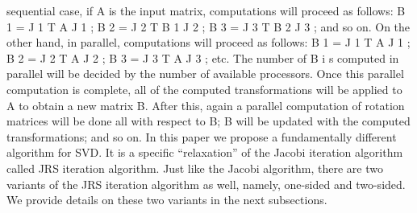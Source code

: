 \documentclass[10pt, conference, compsocconf]{IEEEtran}
\begin{document}
sequential case, if A is the input matrix, computations will
proceed as follows: B 1 = J 1 T A J 1 ; B 2 = J 2 T B 1 J 2 ; B 3 =
J 3 T B 2 J 3 ; and so on. On the other hand, in parallel, computations
will proceed as follows: B 1 = J 1 T A J 1 ; B 2 = J 2 T A J 2 ; B 3 =
J 3 T A J 3 ; etc. The number of B i s computed in parallel will
be decided by the number of available processors. Once
this parallel computation is complete, all of the computed
transformations will be applied to A to obtain a new matrix
B. After this, again a parallel computation of rotation matrices
will be done all with respect to B; B will be updated with the
computed transformations; and so on.
In this paper we propose a fundamentally different algorithm
for SVD. It is a specific “relaxation” of the Jacobi iteration
algorithm called JRS iteration algorithm. Just like the Jacobi
algorithm, there are two variants of the JRS iteration algorithm
as well, namely, one-sided and two-sided. We provide details
on these two variants in the next subsections.
\end{document}
